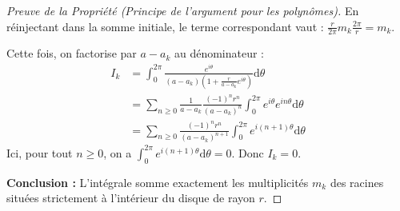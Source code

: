 \begin{proof}[Preuve de la Propriété (Principe de l'argument pour les polynômes)]
    En réinjectant dans la somme initiale, le terme correspondant vaut : $\frac{r}{2\pi} m_k \frac{2\pi}{r} = m_k$.

    
    \svspace
    Cette fois, on factorise par $a - a_k$ au dénominateur :
    \begin{align*}
        I_k &= \int_{0}^{2\pi} \frac{e^{i\theta}}{(a - a_k) \left(1 + \frac{r}{a - a_k} e^{i\theta}\right)} \mathrm{d}\theta \\
            &= \sum_{n \geqslant 0} \frac{1}{a - a_k} \frac{(-1)^n r^n}{(a - a_k)^n} \int_{0}^{2\pi} e^{i\theta} e^{in\theta} \mathrm{d}\theta \\
            &= \sum_{n \geqslant 0} \frac{(-1)^n r^n}{(a - a_k)^{n+1}} \int_{0}^{2\pi} e^{i(n+1)\theta} \mathrm{d}\theta
    \end{align*}
    Ici, pour tout $n \geqslant 0$, on a $\int_{0}^{2\pi} e^{i(n+1)\theta} \mathrm{d}\theta = 0$. Donc $I_k = 0$.

    \avspace
    \textbf{Conclusion :} L'intégrale somme exactement les multiplicités $m_k$ des racines situées strictement à l'intérieur du disque de rayon $r$.
\end{proof}


